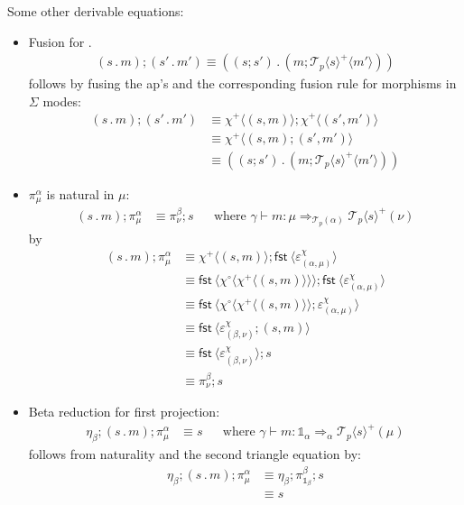 \documentclass[10pt]{article}
\theoremstyle{definition}
\newcommand\dsd[1]{\ensuremath{\mathsf{#1}}}
\newcommand{\tcell}{\Rightarrow}
\newcommand{\app}[2]{\ensuremath{#1 \: #2}}
\newcommand{\fst}[1]{\app{\dsd{fst}}{#1}}
\newcommand\TermTwoT[5]{\ensuremath{#1 \vdash {#2} : #3 \tcell_{#5} #4}}
\newcommand\TrPlus[2]{\ensuremath{{#1}^+(#2)}}
\newcommand\El[2]{\mathcal{T}_{#1}(#2)}
\newcommand\ApEl[2]{\mathcal{T}_{#1}\langle#2\rangle}
\newcommand\bdot[0]{\mathbin{.}}
\newcommand\ap[2]{\ensuremath{#1 \langle #2 \rangle }}
\newcommand\ApPlus[2]{\ensuremath{{#1}^+ \langle #2 \rangle }}
\newcommand\ApCirc[2]{\ensuremath{{#1}^\circ \langle #2 \rangle }}
\newcommand\One{\ensuremath{\mathds{1}}}
\begin{document}
Some other derivable equations:
\begin{itemize}
\item Fusion for $.$
\begin{align}
\label{dot-fusion}
    (s \bdot m);(s' \bdot m') \equiv ((s;s') \bdot (m;\ApPlus{\ApEl{p}{s}} {m'}))
\end{align}
follows by fusing the ap's and the corresponding fusion rule for morphisms in $\Sigma$ modes:
\begin{align*}
(s \bdot m);(s' \bdot m') &\equiv \ApPlus{\chi}{(s, m)} ; \ApPlus{\chi}{(s', m')} \\
&\equiv \ApPlus{\chi}{(s, m);(s', m')} \\
&\equiv ((s;s') \bdot (m;\ApPlus{\ApEl{p}{s}} {m'}))
\end{align*}

\item $\pi^\alpha_\mu$ is natural in $\mu$:
  \begin{align}
  \label{pi-naturality}
  (s \bdot m); \pi^\alpha_\mu &\equiv \pi^\beta_\nu;s && \text{where } \TermTwoT{\gamma}{m}{\mu}{\TrPlus{\ApEl{p}{s}}{\nu}}{\El{p}{\alpha}}
  \end{align}
  by
  \begin{align*}
  (s \bdot m); \pi^\alpha_\mu 
  &\equiv \ApPlus{\chi}{(s, m)} ; \ap \fst {\varepsilon^\chi_{(\alpha, \mu)}} \\  
  &\equiv \ap{\fst}{\ApCirc{\chi}{\ApPlus{\chi}{(s, m)}}} ; \ap \fst {\varepsilon^\chi_{(\alpha, \mu)}} \\
  &\equiv \ap{\fst}{\ApCirc{\chi}{\ApPlus{\chi}{(s, m)}} ; \varepsilon^\chi_{(\alpha, \mu)}}  \\
  &\equiv \ap{\fst}{\varepsilon^\chi_{(\beta, \nu)}; (s, m) } \\
  &\equiv \ap{\fst}{\varepsilon^\chi_{(\beta, \nu)}} ; s\\
  &\equiv \pi^\beta_\nu ; s
  \end{align*}

\item Beta reduction for first projection:
  \begin{align}
\label{beta-pi}
\eta_\beta;(s \bdot m);\pi^\alpha_\mu &\equiv s && \text{where } \TermTwoT{\gamma}{m}{\One_\alpha}{\TrPlus{\ApEl{p}{s}}{\mu}}{\alpha}
  \end{align}
follows from naturality and the second triangle equation by:
\begin{align*}
\eta_\beta;(s \bdot m);\pi^\alpha_\mu
&\equiv \eta_\beta;\pi^\beta_{\One_\beta};s \\
&\equiv s
\end{align*}


\end{itemize}
\end{document}
